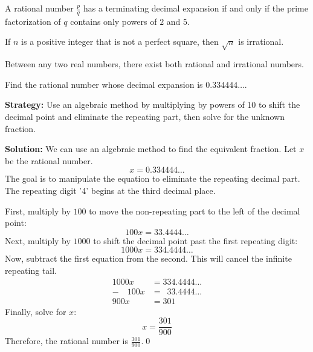 \begin{theorem}
A rational number $\frac{p}{q}$ has a terminating decimal expansion if and only if the prime factorization of $q$ contains only powers of $2$ and $5$.
\end{theorem}

\begin{theorem}
If $n$ is a positive integer that is not a perfect square, then $\sqrt{n}$ is irrational.
\end{theorem}

\begin{theorem}
Between any two real numbers, there exist both rational and irrational numbers.
\end{theorem}



\begin{problembox}
\begin{problemstatement}
Find the rational number whose decimal expansion is $0.334444\ldots$.
\end{problemstatement}
\end{problembox}

\noindent\textbf{Strategy:} Use an algebraic method by multiplying by powers of 10 to shift the decimal point and eliminate the repeating part, then solve for the unknown fraction.

\bigskip\noindent\textbf{Solution:}
We can use an algebraic method to find the equivalent fraction. Let $x$ be the rational number.
$$x = 0.334444\ldots$$
The goal is to manipulate the equation to eliminate the repeating decimal part. The repeating digit '4' begins at the third decimal place.

First, multiply by $100$ to move the non-repeating part to the left of the decimal point:
$$100x = 33.4444\ldots$$
Next, multiply by $1000$ to shift the decimal point past the first repeating digit:
$$1000x = 334.4444\ldots$$
Now, subtract the first equation from the second. This will cancel the infinite repeating tail.
\begin{align*}
1000x &= 334.4444\ldots \\
-\quad 100x &= \phantom{0}33.4444\ldots \\
\hline
900x &= 301
\end{align*}
Finally, solve for $x$:
$$x = \frac{301}{900}$$
Therefore, the rational number is \textbf{$\frac{301}{900}$}.\qed




